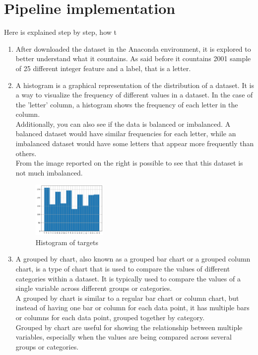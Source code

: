 \documentclass{article}
\begin{document}
\section{Pipeline implementation}
Here is explained step by step, how t
\begin{enumerate}
    \item After downloaded the dataset in the Anaconda environment, it is explored to better understand what it countains. As said before it countains 2001 sample of 25 different integer feature and a label, that is a letter.
    \item \begin{multicols}{2}
    A histogram is a graphical representation of the distribution of a dataset. It is a way to visualize the frequency of different values in a dataset. In the case of the 'letter' column, a histogram shows the frequency of each letter in the column.\\ Additionally, you can also see if the data is balanced or imbalanced. A balanced dataset would have similar frequencies for each letter, while an imbalanced dataset would have some letters that appear more frequently than others.\\From the image reported on the right is possible to see that this dataset is not much imbalanced.
        \columnbreak
        \begin{figure}[H]
            \begin{center}
            \includegraphics[width=0.34\textwidth]{histogram.png}
            \caption{Histogram of targets}
            \end{center}
        \end{figure} 
    \end{multicols}
    \item \begin{multicols}{2}A grouped by chart, also known as a grouped bar chart or a grouped column chart, is a type of chart that is used to compare the values of different categories within a dataset. It is typically used to compare the values of a single variable across different groups or categories.\\A grouped by chart is similar to a regular bar chart or column chart, but instead of having one bar or column for each data point, it has multiple bars or columns for each data point, grouped together by category.\\Grouped by chart are useful for showing the relationship between multiple variables, especially when the values are being compared across several groups or categories.

\end{multicols}
\end{enumerate}
\end{document}
